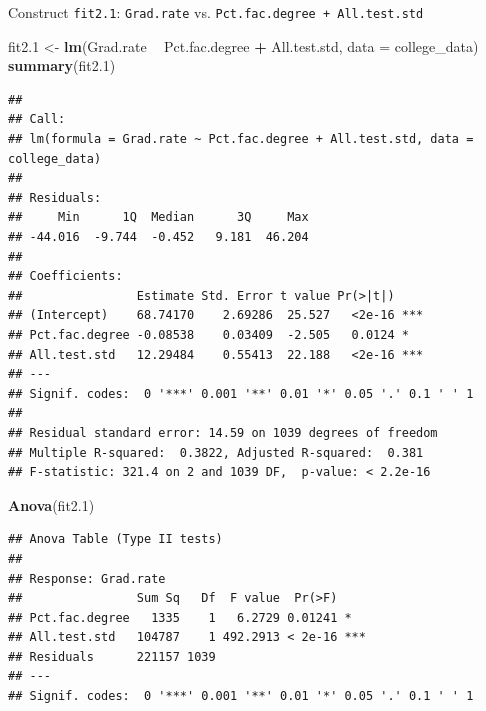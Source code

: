 \documentclass[]{article}
\newenvironment{Shaded}{\begin{snugshade}}{\end{snugshade}}
\newcommand{\KeywordTok}[1]{\textcolor[rgb]{0.13,0.29,0.53}{\textbf{#1}}}
\newcommand{\DataTypeTok}[1]{\textcolor[rgb]{0.13,0.29,0.53}{#1}}
\newcommand{\DecValTok}[1]{\textcolor[rgb]{0.00,0.00,0.81}{#1}}
\newcommand{\StringTok}[1]{\textcolor[rgb]{0.31,0.60,0.02}{#1}}
\newcommand{\CommentTok}[1]{\textcolor[rgb]{0.56,0.35,0.01}{\textit{#1}}}
\newcommand{\OperatorTok}[1]{\textcolor[rgb]{0.81,0.36,0.00}{\textbf{#1}}}
\newcommand{\NormalTok}[1]{#1}
\begin{document}
\begin{Shaded}
\end{Shaded}

\vspace{.1in}

Construct \texttt{fit2.1}: \texttt{Grad.rate} vs.
\texttt{Pct.fac.degree\ +\ All.test.std}

\begin{Shaded}
\begin{Highlighting}[]
\NormalTok{fit2.}\DecValTok{1}\NormalTok{ <-}\StringTok{ }\KeywordTok{lm}\NormalTok{(Grad.rate }\OperatorTok{~}\StringTok{ }\NormalTok{Pct.fac.degree }\OperatorTok{+}\StringTok{ }\NormalTok{All.test.std, }\DataTypeTok{data =}\NormalTok{ college_data)}
\KeywordTok{summary}\NormalTok{(fit2.}\DecValTok{1}\NormalTok{)}
\end{Highlighting}
\end{Shaded}

\begin{verbatim}
## 
## Call:
## lm(formula = Grad.rate ~ Pct.fac.degree + All.test.std, data = college_data)
## 
## Residuals:
##     Min      1Q  Median      3Q     Max 
## -44.016  -9.744  -0.452   9.181  46.204 
## 
## Coefficients:
##                Estimate Std. Error t value Pr(>|t|)    
## (Intercept)    68.74170    2.69286  25.527   <2e-16 ***
## Pct.fac.degree -0.08538    0.03409  -2.505   0.0124 *  
## All.test.std   12.29484    0.55413  22.188   <2e-16 ***
## ---
## Signif. codes:  0 '***' 0.001 '**' 0.01 '*' 0.05 '.' 0.1 ' ' 1
## 
## Residual standard error: 14.59 on 1039 degrees of freedom
## Multiple R-squared:  0.3822, Adjusted R-squared:  0.381 
## F-statistic: 321.4 on 2 and 1039 DF,  p-value: < 2.2e-16
\end{verbatim}

\begin{Shaded}
\begin{Highlighting}[]
\KeywordTok{Anova}\NormalTok{(fit2.}\DecValTok{1}\NormalTok{)}
\end{Highlighting}
\end{Shaded}

\begin{verbatim}
## Anova Table (Type II tests)
## 
## Response: Grad.rate
##                Sum Sq   Df  F value  Pr(>F)    
## Pct.fac.degree   1335    1   6.2729 0.01241 *  
## All.test.std   104787    1 492.2913 < 2e-16 ***
## Residuals      221157 1039                     
## ---
## Signif. codes:  0 '***' 0.001 '**' 0.01 '*' 0.05 '.' 0.1 ' ' 1
\end{verbatim}
\end{document}

